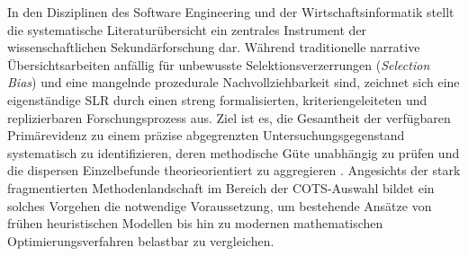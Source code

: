 In den Disziplinen des Software Engineering und der Wirtschaftsinformatik stellt die systematische Literaturübersicht ein zentrales Instrument der wissenschaftlichen Sekundärforschung dar. Während traditionelle narrative Übersichtsarbeiten anfällig für unbewusste Selektionsverzerrungen (\textit{Selection Bias}) und eine mangelnde prozedurale Nachvollziehbarkeit sind, zeichnet sich eine eigenständige SLR durch einen streng formalisierten, kriteriengeleiteten und replizierbaren Forschungsprozess aus. Ziel ist es, die Gesamtheit der verfügbaren Primärevidenz zu einem präzise abgegrenzten Untersuchungsgegenstand systematisch zu identifizieren, deren methodische Güte unabhängig zu prüfen und die dispersen Einzelbefunde theorieorientiert zu aggregieren \parencite[S.~880 bis 882]{2NHFUF5N}. Angesichts der stark fragmentierten Methodenlandschaft im Bereich der COTS-Auswahl bildet ein solches Vorgehen die notwendige Voraussetzung, um bestehende Ansätze von frühen heuristischen Modellen bis hin zu modernen mathematischen Optimierungsverfahren belastbar zu vergleichen.

